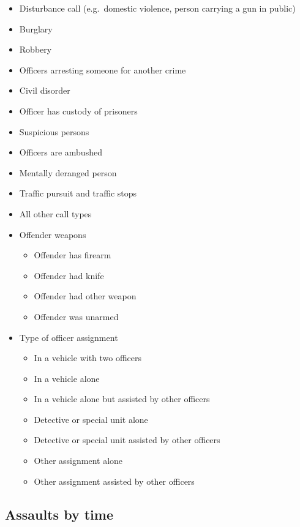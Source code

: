 \documentclass[
  12pt,
  openany]{book}
\providecommand{\tightlist}{%
  \setlength{\itemsep}{0pt}\setlength{\parskip}{0pt}}
\begin{document}
\begin{itemize}
\item
  Disturbance call (e.g.~domestic violence, person carrying a gun in public)
\item
  Burglary
\item
  Robbery
\item
  Officers arresting someone for another crime
\item
  Civil disorder
\item
  Officer has custody of prisoners
\item
  Suspicious persons
\item
  Officers are ambushed
\item
  Mentally deranged person
\item
  Traffic pursuit and traffic stops
\item
  All other call types
\item
  Offender weapons

  \begin{itemize}
  \tightlist
  \item
    Offender has firearm
  \item
    Offender had knife
  \item
    Offender had other weapon
  \item
    Offender was unarmed
  \end{itemize}
\item
  Type of officer assignment

  \begin{itemize}
  \tightlist
  \item
    In a vehicle with two officers
  \item
    In a vehicle alone
  \item
    In a vehicle alone but assisted by other officers
  \item
    Detective or special unit alone
  \item
    Detective or special unit assisted by other officers
  \item
    Other assignment alone
  \item
    Other assignment assisted by other officers
  \end{itemize}
\end{itemize}

\hypertarget{assaults-by-time}{%
\subsection{Assaults by time}\label{assaults-by-time}}
\end{document}
